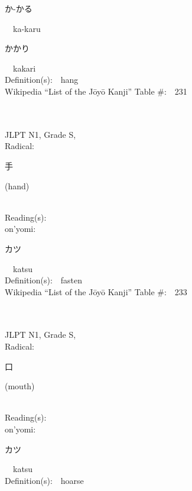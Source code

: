 \begin{multicols}{2}
{\hspace*{2em}}{\begin{CJK}{UTF8}{min} か-かる \end{CJK}}\ \ ka-karu\ \ \\
{\hspace*{2em}}{\begin{CJK}{UTF8}{min} かかり \end{CJK}}\ \ kakari\ \ \\
Definition(s):\ \ hang \\
Wikipedia ``List of the J\=oy\=o Kanji'' Table \#:\ \ 231 \\
\ \ \\
{\fontsize{34pt}{40pt}  }\ \ \\
{JLPT N1, Grade S, \\Radical:\ \ {\begin{CJK}{UTF8}{min} 手 \end{CJK}} (hand) } \\
Reading(s):\ \ \\
{\hspace*{1em}}on'yomi:\ \ \\
{\hspace*{2em}}{\begin{CJK}{UTF8}{min} カツ \end{CJK}}\ \ katsu\ \ \\
Definition(s):\ \ fasten \\
Wikipedia ``List of the J\=oy\=o Kanji'' Table \#:\ \ 233 \\
\ \ \\
{\fontsize{34pt}{40pt}  }\ \ \\
{JLPT N1, Grade S, \\Radical:\ \ {\begin{CJK}{UTF8}{min} 口 \end{CJK}} (mouth) } \\
Reading(s):\ \ \\
{\hspace*{1em}}on'yomi:\ \ \\
{\hspace*{2em}}{\begin{CJK}{UTF8}{min} カツ \end{CJK}}\ \ katsu\ \ \\
Definition(s):\ \ hoarse \\

\end{multicols}
